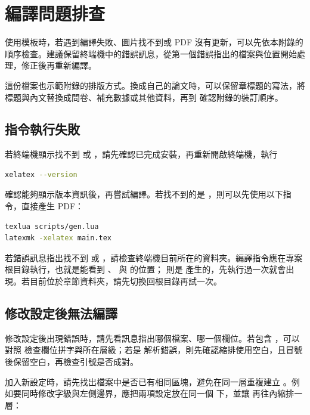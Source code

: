 \chapter{編譯問題排查}\label{appendix-a}

使用模板時，若遇到編譯失敗、圖片找不到或 PDF 沒有更新，可以先依本附錄的順序檢查。建議保留終端機中的錯誤訊息，從第一個錯誤指出的檔案與位置開始處理，修正後再重新編譯。

這份檔案也示範附錄的排版方式。換成自己的論文時，可以保留章標題的寫法，將標題與內文替換成問卷、補充數據或其他資料，再到  確認附錄的裝訂順序。

\section{指令執行失敗}

若終端機顯示找不到  或 ，請先確認已完成安裝，再重新開啟終端機，執行

\begin{lstlisting}[language=bash]
xelatex --version
\end{lstlisting}

確認能夠顯示版本資訊後，再嘗試編譯。若找不到的是 ，則可以先使用以下指令，直接產生 PDF：

\begin{lstlisting}[language=bash]
texlua scripts/gen.lua
latexmk -xelatex main.tex
\end{lstlisting}

若錯誤訊息指出找不到  或 ，請檢查終端機目前所在的資料夾。編譯指令應在專案根目錄執行，也就是能看到 、 與  的位置； 則是  產生的，先執行過一次就會出現。若目前位於章節資料夾，請先切換回根目錄再試一次。

\section{修改設定後無法編譯}

修改設定後出現錯誤時，請先看訊息指出哪個檔案、哪一個欄位。若包含 ，可以對照  檢查欄位拼字與所在層級；若是  解析錯誤，則先確認縮排使用空白，且冒號後保留空白，再檢查引號是否成對。

加入新設定時，請先找出檔案中是否已有相同區塊，避免在同一層重複建立 。例如要同時修改字級與左側邊界，應把兩項設定放在同一個  下，並讓  再往內縮排一層：

